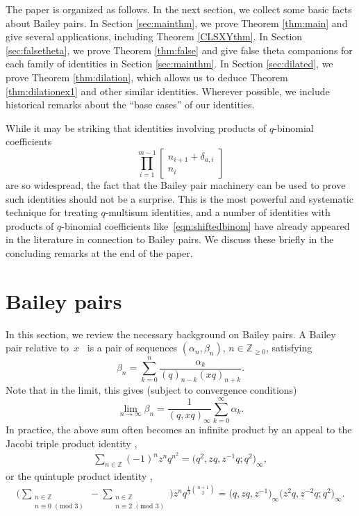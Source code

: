 \documentclass[pdftex]{sigma}
\numberwithin{equation}{section}
\newcommand{\ZZ}{\mathbb{Z}}
\begin{document}
The paper is organized as follows. In the next section, we collect some basic facts about Bailey pairs. In Section \ref{sec:mainthm}, we prove Theorem \ref{thm:main} and give several applications, including Theorem \ref{CLSXYthm}. In Section \ref{sec:falsetheta}, we prove Theorem \ref{thm:false} and give false theta companions for each family of identities in Section \ref{sec:mainthm}. In Section \ref{sec:dilated}, we prove Theorem \ref{thm:dilation}, which allows us to deduce Theorem \ref{thm:dilationex1} and other similar identities.
Wherever possible, we include historical remarks about the ``base cases'' of our identities.

While it may be striking that identities involving products of $q$-binomial coefficients
\begin{equation}
	\prod_{i=1}^{m-1} \begin{bmatrix} n_{i+1} + \delta_{a,i} \\ n_i \end{bmatrix}
	\label{eqn:shiftedbinom}
\end{equation}
are so widespread, the fact that the Bailey pair machinery can be used to prove such identities should not be a surprise. This is the most powerful and systematic technique for treating $q$-multisum identities, and a number of identities with products of $q$-binomial coefficients like~\eqref{eqn:shiftedbinom} have already appeared in the literature in connection to Bailey pairs. We discuss these briefly in the concluding remarks at the end of the paper.

\section{Bailey pairs}
In this section, we review the necessary background on Bailey pairs. A Bailey pair relative to~$x$~\cite{Andmultiple} is a pair of sequences $(\alpha_n,\beta_n)$,
$n\in \ZZ_{\geq 0}$,
satisfying
\begin{equation*} %
	\beta_n = \sum_{k=0}^n \frac{\alpha_k}{(q)_{n-k}(xq)_{n+k}}.
\end{equation*}
Note that in the limit, this gives (subject to convergence conditions)
\begin{equation} \label{Baileylimit}
	\lim_{n \to \infty} \beta_n = \frac{1}{(q,xq)_{\infty}} \sum_{k=0}^{\infty} \alpha_k.
\end{equation}
In practice, the above sum often becomes an infinite product by an appeal to the Jacobi triple product identity \cite[equation~(2.2.10)]{AndBook},
\begin{align}
	\sum_{n\in\ZZ}(-1)^n z^nq^{n^2}=\bigl(q^2,zq,z^{-1}q;q^2\bigr)_\infty,
	\label{eqn:jtp}
\end{align}
or the quintuple product identity \cite{C-quint},
\begin{align}
	\Biggl(\sum_{\substack{n\in\ZZ\\ n\equiv 0\,\,(\mathrm{mod}\,\,3)}}
	-\sum_{\substack{n\in\ZZ\\ n\equiv 2\,\,(\mathrm{mod}\,\,3)}}
	\Biggr) z^nq^{\frac{1}{3}\binom{n+1}{2}}=\bigl(q,zq,z^{-1}\bigr)_\infty\bigl(z^2q,z^{-2}q;q^2\bigr)_\infty
	\label{eqn:qtp}.
\end{align}
\end{document}
